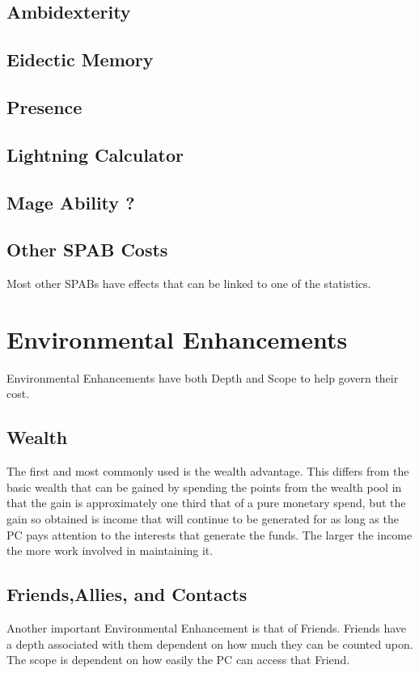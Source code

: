 \subsection{Ambidexterity}
\subsection{Eidectic Memory}
\subsection{Presence}
\subsection{Lightning Calculator}
\subsection{Mage Ability ?}
\subsection{Other SPAB Costs}

Most other SPABs have effects that can be linked to one of the
statistics.

\section{Environmental Enhancements}

Environmental Enhancements have both Depth and Scope to help govern
their cost.

\subsection{Wealth}

The first and most commonly used is the wealth advantage. This differs
from the basic wealth that can be gained by spending the points from the
wealth pool in that the gain is approximately one third that of a pure
monetary spend, but the gain so obtained is income that will continue to
be generated for as long as the PC pays attention to the interests that
generate the funds. The larger the income the more work involved in
maintaining it.

\subsection{Friends,Allies, and Contacts}

Another important Environmental Enhancement is that of Friends. Friends
have a depth associated with them dependent on how much they can be
counted upon. The scope is dependent on how easily the PC can access
that Friend.

